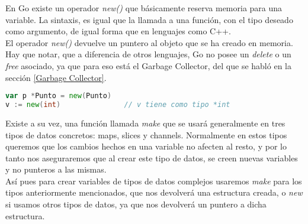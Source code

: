 	En Go existe un operador \emph{new()} que básicamente reserva memoria para
	una variable. La sintaxis, es igual que la llamada a una función, con el
	tipo deseado como argumento, de igual forma que en lenguajes como C++.\\

	El operador \emph{new()} devuelve un puntero al objeto que se ha creado en
	memoria. Hay que notar, que a diferencia de otros lenguajes, Go no posee un
	\emph{delete} o un \textit{free} asociado, ya que para eso está el Garbage
	Collector, del que se habló en la sección \ref{Garbage Collector}.

\begin{minipage}{17.1cm}
\begin{lstlisting}[language=go,numbers=none,caption=Ejemplo del operador
new(),label=opnew]
var p *Punto = new(Punto)
v := new(int)				// v tiene como tipo *int
\end{lstlisting}
\end{minipage}

	Existe a su vez, una función llamada \emph{make} que se usará generalmente
	en tres tipos de datos concretos: maps, slices y channels. Normalmente en
	estos tipos queremos que los cambios hechos en una variable no afecten al
	resto, y por lo tanto nos aseguraremos que al crear este tipo de datos, se
	creen nuevas variables y no punteros a las mismas.\\

	Así pues para crear variables de tipos de datos complejos usaremos
	\emph{make} para los tipos anteriormente mencionados, que nos devolverá
	una estructura creada, o \emph{new} si usamos otros tipos de datos, ya que
	nos devolverá un puntero a dicha estructura.

